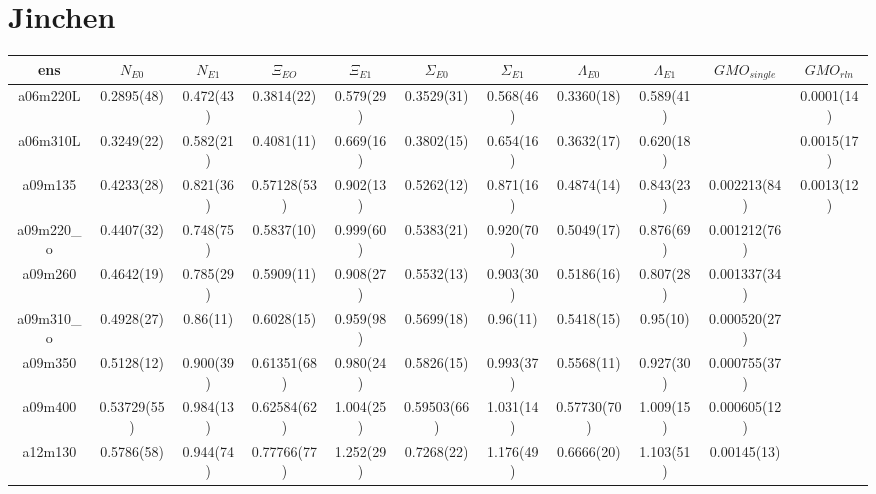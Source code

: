 \documentclass{article}
\begin{document}
\section*{Jinchen}
\begin{table}[h!]
  \centering
 \setlength{\arrayrulewidth}{0.5mm}
\setlength{\tabcolsep}{10pt}
\renewcommand{\arraystretch}{2}
 \begin{tabular}{|| c |c | c | c | c | c | c | c | c | c | c ||} 
 \hline
 ens & $N_{E0}$ & $N_{E1}$ & $\Xi_{EO}$ &  $\Xi_{E1}$ & $\Sigma_{E0}$ & $\Sigma_{E1}$ & $\Lambda_{E0}$ & $\Lambda_{E1}$ & $GMO_{single}$ &  $GMO_{rln}$ \\ [0.8ex] 
 \hline\hline
 a06m220L 
 & {0.2895(48)}   &   {0.472(43)} & {0.3814(22)}   & {0.579(29)}   & {0.3529(31)}  & {0.568(46)}   & {0.3360(18)}  & {0.589(41)}  & {}  & {0.0001(14)} \\ 
 \hline
 a06m310L 
  & {0.3249(22)}   &   {0.582(21)} & {0.4081(11)}   & {0.669(16)}   & {0.3802(15)}  & {0.654(16)}   & {0.3632(17)}  & {0.620(18)}  & {}  & {0.0015(17)} \\
 \hline
 a09m135 
  & {0.4233(28)}   &   {0.821(36)} & {0.57128(53)}   & {0.902(13)}   & {0.5262(12)}  & {0.871(16)}   & {0.4874(14)}  & {0.843(23)}  & {0.002213(84)}  & {0.0013(12)} \\
 \hline
 a09m220_o 
 & {0.4407(32)}   &   {0.748(75)} & {0.5837(10)}   & {0.999(60)}   & {0.5383(21)}  & {0.920(70)}   & {0.5049(17)}  & {0.876(69)}  & {0.001212(76)}  & {} \\
 \hline
 a09m260
  & {0.4642(19)}   &   {0.785(29)} & {0.5909(11)}   & {0.908(27)}   & {0.5532(13)}  & {0.903(30)}   & {0.5186(16)}  & {0.807(28)}  & {0.001337(34)}  & {} \\
 \hline
 a09m310_o
  & {0.4928(27)}   &   {0.86(11)} & {0.6028(15)}   & {0.959(98)}   & {0.5699(18)}  & {0.96(11)}   & {0.5418(15)}  & {0.95(10)}  & {0.000520(27)}  & {} \\
 \hline
 a09m350 
  & {0.5128(12)}   &   {0.900(39)} & {0.61351(68)}   & {0.980(24)}   & {0.5826(15)}  & {0.993(37)}   & {0.5568(11)}  & {0.927(30)}  & {0.000755(37)}  & {} \\
 \hline
 a09m400 
  & {0.53729(55)}   &   {0.984(13)} & {0.62584(62)}   & {1.004(25)}   & {0.59503(66)}  & {1.031(14)}   & {0.57730(70)}  & {1.009(15)}  & {0.000605(12)}  & {} \\
 \hline
 a12m130 
  & {0.5786(58)}   &   {0.944(74)} & {0.77766(77)}   & {1.252(29)}   & {0.7268(22)}  & {1.176(49)}   & {0.6666(20)}  & {1.103(51)}  & {0.00145(13)}  & {} \\

\end{tabular}
\end{table}
\end{document}
